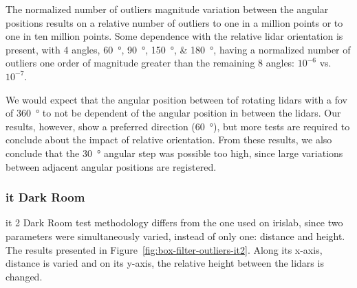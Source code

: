 The normalized number of outliers magnitude variation between the angular positions results on a relative number of outliers to one in a million points or to one in ten million points. Some dependence with the relative \ac{lidar} orientation is present, with 4 angles, \SIlist[list-final-separator = {, }]{60; 90; 150; 180}{\degree}, having a normalized number of outliers one order of magnitude greater than the remaining 8 angles: $10^{-6}$ vs. $10^{-7}$.

We would expect that the angular position between \ac{tof} rotating \acp{lidar} with a \ac{fov} of \SI{360}{\degree} to not be dependent of the angular position in between the \acp{lidar}. Our results, however, show a preferred direction (\SI{60}{\degree}), but more tests are required to conclude about the impact of relative orientation. From these results, we also conclude that the \SI{30}{\degree} angular step was possible too high, since large variations between adjacent angular positions are registered.




\subsubsection{\acl{it} Dark Room}
\ac{it} 2 Dark Room test methodology differs from the one used on \ac{irislab}, since two parameters were simultaneously varied, instead of only one: distance and height. The results presented in Figure~\ref{fig:box-filter-outliers-it2}. Along its x-axis, distance is varied and on its y-axis, the relative height between the \acp{lidar} is changed.

